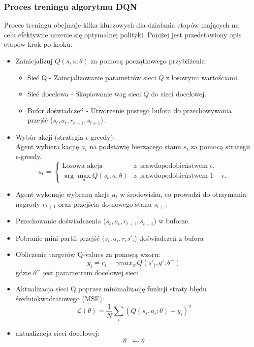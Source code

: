 \documentclass[a4paper, 10pt]{article}
\begin{document}
    \subsubsection{Proces treningu algorytmu DQN}
    Proces treningu obejmuje kilka kluczowych dla działania etapów mających na celu efektywne uczenie się optymalnej polityki.
    Poniżej jest przedstawiony opis etapów krok po kroku:
    \begin{itemize}
        \item Zainicjalizuj \( Q(s,a;\theta) \) za pomocą początkowego przybliżenia:
        \begin{itemize}
            \item Sieć Q - Zaincjalizowanie parametrów sieci \( Q \) z losowymi wartościami.
            \item Sieć docelowa - Skopiowanie wag sieci \( Q \) do sieci docelowej.
            \item Bufor doświadczeń - Utworzenie pustego bufora do przechowywania przejść (\( s_t, a_t, r_{t+1}, s_{t+1} \)).
        \end{itemize}
        \item Wybór akcji (strategia \( \epsilon \)-greedy): \\
        Agent wybiera kacjię \( a_t \) na podstawię bierzącego stanu \( s_t \) za pomocą strategii \( \epsilon \)-greedy.
        \[
        a_t =
        \begin{cases} 
        \text{Losowa akcja} & \text{z prawdopodobieństwem } \epsilon, \\
        \arg\max_a Q(s_t, a; \theta) & \text{z prawdopodobieństwem } 1 - \epsilon.
        \end{cases}
        \]
        \item Agent wykonuje wybraną akcję \( a_t \) w środowisku, co prowadzi do otrzymania nagrody \( r_{t+1} \)
        oraz przejścia do nowego stanu \( s_{t+1} \)
        \item Przechowanie doświadczenia (\( s_t, a_t, r_{t+1}, s_{t+1} \)) w buforze.
        \item Pobranie mini-partii przejść (\(s_i, a_i, r_i s'_i \)) doświadczeń z bufora
        \item Obliczenie targetów Q-values za pomocą wzoru:
        \[ y_i = r_i + \gamma max_{a'}Q(s'_i,q';\theta^-) \]
        gdzie \( \theta^- \) jest parametrem docelowej sieci
        \item Aktualizacja sieci Q poprzez minimalizację funkcji straty błędu średniokwadratowego (MSE):
        \[ \mathcal{L}(\theta) = \frac{1}{N} \sum_{i}(Q(s_i,a_i;\theta)-y_i)^2 \]
        \item aktualizacja sieci docelowej:
        \[ \theta^- \leftarrow \theta \]
    \end{itemize}
\end{document}
